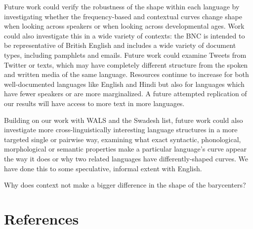 \documentclass[
  english,
  man,floatsintext]{apa6}
\begin{document}
Future work could verify the robustness of the shape within each language by investigating whether the frequency-based and contextual curves change shape when looking across speakers or when looking across developmental ages. Work could also investigate this in a wide variety of contexts: the BNC is intended to be representative of British English and includes a wide variety of document types, including pamphlets and emails. Future work could examine Tweets from Twitter or texts, which may have completely different structure from the spoken and written media of the same language. Resources continue to increase for both well-documented languages like English and Hindi but also for languages which have fewer speakers or are more marginalized. A future attempted replication of our results will have access to more text in more languages.

Building on our work with WALS and the Swadesh list, future work could also investigate more cross-linguistically interesting language structures in a more targeted single or pairwise way, examining what exact syntactic, phonological, morphological or semantic properties make a particular language's curve appear the way it does or why two related languages have differently-shaped curves. We have done this to some speculative, informal extent with English.

Why does context not make a bigger difference in the shape of the barycenters?

\newpage

\hypertarget{references}{%
\section{References}\label{references}}

\begingroup
\setlength{\parindent}{-0.5in}
\setlength{\leftskip}{0.5in}
\end{document}
